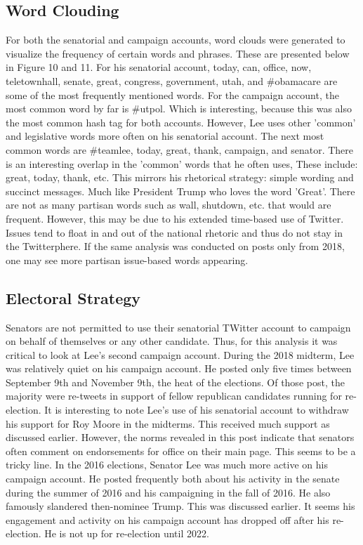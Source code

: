 \documentclass{article}
\begin{document}
\subsection{Word Clouding}
\begin{flushleft}
For both the senatorial and campaign accounts, word clouds were generated to visualize the frequency of certain words and phrases. These are presented below in Figure 10 and 11. For his senatorial account, today, can, office, now, teletownhall, senate, great, congress, government, utah, and \#obamacare are some of the most frequently mentioned words. For the campaign account, the most common word by far is #utpol. Which is interesting, because this was also the most common hash tag for both accounts. However, Lee uses other 'common' and legislative words more often on his senatorial account. The next most common words are \#teamlee, today, great, thank, campaign, and senator. There is an interesting overlap in the 'common' words that he often uses, These include: great, today, thank, etc. This mirrors his rhetorical strategy: simple wording and succinct messages. Much like President Trump who loves the word 'Great'. There are not as many partisan words such as wall, shutdown, etc. that would are frequent. However, this may be due to his extended time-based use of Twitter. Issues tend to float in and out of the national rhetoric and thus do not stay in the Twitterphere. If the same analysis was conducted on posts only from 2018, one may see more partisan issue-based words appearing. 
\end{flushleft}

\subsection{Electoral Strategy}
\begin{flushleft}
Senators are not permitted to use their senatorial TWitter account to campaign on behalf of themselves or any other candidate. Thus, for this analysis it was critical to look at Lee's second campaign account. During the 2018 midterm, Lee was relatively quiet on his campaign account. He posted only five times between September 9th and November 9th, the heat of the elections. Of those post, the majority were re-tweets in support of fellow republican candidates running for re-election. It is interesting to note Lee's use of his senatorial account to withdraw his support for Roy Moore in the midterms. This received much support as discussed earlier. However, the norms revealed in this post indicate that senators often comment on endorsements for office on their main page. This seems to be a tricky line. In the 2016 elections, Senator Lee was much more active on his campaign account. He posted frequently both about his activity in the senate during the summer of 2016 and his campaigning in the fall of 2016. He also famously slandered then-nominee Trump. This was discussed earlier. It seems his engagement and activity on his campaign account has dropped off after his re-election. He is not up for re-election until 2022. 
\end{flushleft}
\end{document}
